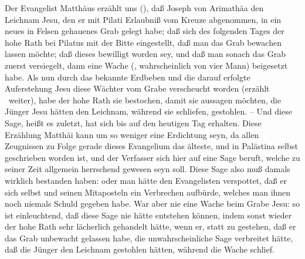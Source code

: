 \begin{aufza}
Der Evangelist Matthäus erzählt uns (), daß Joseph von Arimathäa den Leichnam Jesu, den er mit Pilati Erlaubniß vom Kreuze abgenommen, in ein neues in Felsen gehauenes Grab gelegt habe; daß sich des folgenden Tages der hohe Rath bei Pilatus mit der Bitte eingestellt, daß man das Grab bewachen lassen möchte; daß dieses bewilligt worden sey, und daß man sonach das Grab zuerst versiegelt, dann eine Wache (, wahrscheinlich von vier Mann) beigesetzt habe. Als nun durch das bekannte Erdbeben und die darauf erfolgte Auferstehung Jesu diese Wächter vom Grabe verscheucht worden (erzählt \ weiter), habe der hohe Rath sie bestochen, damit sie aussagen möchten, die Jünger Jesu hätten den Leichnam, während sie schliefen, gestohlen. -- Und diese Sage, heißt es zuletzt, hat sich bis auf den heutigen Tag erhalten. Diese Erzählung Matthäi kann um so weniger eine Erdichtung seyn, da allen Zeugnissen zu Folge gerade dieses Evangelium das älteste, und in Palästina selbst geschrieben worden ist, und der Verfasser sich hier auf eine Sage beruft, welche zu seiner Zeit allgemein herrschend gewesen seyn soll. Diese Sage also muß damals wirklich bestanden haben: oder man hätte den Evangelisten verspottet, daß er sich selbst und seinen Mitaposteln ein Verbrechen aufbürde, welches man ihnen noch niemals Schuld gegeben habe. War aber nie eine Wache beim Grabe Jesu: so ist einleuchtend, daß diese Sage nie hätte entstehen können, indem sonst wieder der hohe Rath sehr lächerlich gehandelt hätte, wenn er, statt zu gestehen, daß er das Grab unbewacht gelassen habe, die unwahrscheinliche Sage verbreitet hätte, daß die Jünger den Leichnam gestohlen hätten, während die Wache schlief.


\end{aufza}
